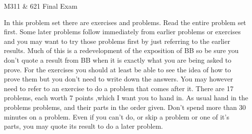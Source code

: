 \documentclass[12pt]{amsart}
\theoremstyle{definition}
\begin{document}
 
\begin{center} M311 \& 621 Final Exam \end{center}
In this problem set there are exercises and problems. Read the entire problem set first. Some later problems follow immediately from earlier problems or exercises and you may want to try those problems first by just referring to the earlier results. Much of this is a redevelopment of the exposition of BB so be sure you don't quote a result from BB when it is exactly what you are being asked to prove.
For the exercises you should at least be able to see the idea of how to prove them but you don't need to write down the answers. You may however need to refer to an exercise to do a problem that comes after it. There are 17 problems, each worth 7 points ,which I want you to hand in.  As usual hand in the problems problems, and their parts  in the order given. Don't spend more than 30 minutes on a problem. Even if you can't do, or skip a problem or one of it's parts, you may quote its result to do a later problem. 
\end{document}
